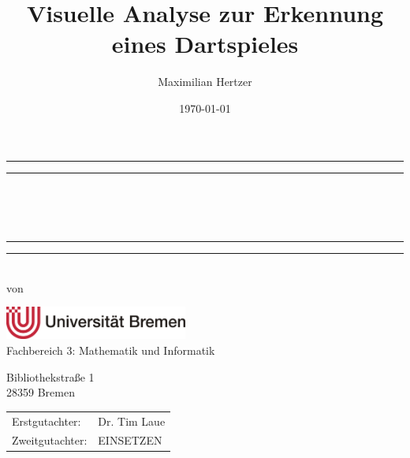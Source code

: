 \documentclass[
  ,a4paper
  ,ngerman
  ,twoside
  ,openright
  ,11pt
  ,bibliography=totoc
  ,index=totoc
  ,listof=totoc
  ,titlepage=true
  ,headlines=2
  ,footlines=2
  ,svgnames
  ,BCOR=5mm
  ,numbers=noendperiod
  ]{scrreprt}
\author{Maximilian Hertzer}
\title{Visuelle Analyse zur Erkennung eines Dartspieles}
\subtitle{}
\date{\today}
\begin{document}
\lstset{language=Python}  
\thispagestyle{empty}


\makeatletter
\begin{titlepage}
	\centering
	\rule[0.5ex]{\linewidth}{2pt}\vspace*{-\baselineskip}\vspace*{3.2pt}
	\rule[0.5ex]{\linewidth}{1pt}\\[\baselineskip]
	{\Huge \@title }\\[4mm]
	{\Large \textit{\@subject}}\\
	\rule[0.5ex]{\linewidth}{1pt}\vspace*{-\baselineskip}\vspace{3.2pt}
	\rule[0.5ex]{\linewidth}{2pt}\\
	\vspace{6.5mm}
	{\large von}\\
	\vspace{6.5mm}
	{\LARGE \textsc{\@author}}
	
	\vspace{11mm}
	\includegraphics[width=6cm]{media/uni-bremen}\\
	\vspace{3mm}
	{\large Fachbereich 3: Mathematik und Informatik}
	
	Bibliothekstraße 1 \\
	28359 Bremen
	
	\vspace{9mm}
	{\large\textsc{\@date}}
	\vfill
    \begin{tabular}{ll}
        
        Erstgutachter:  & Dr. Tim Laue\\
        Zweitgutachter: & EINSETZEN\\
    \end{tabular}
	\vspace{12mm}
\end{titlepage}
\makeatother
\cleardoublepage
\listoftodos
\tableofcontents

\listoffigures
\begingroup
\let\cleardoublepage\relax
\listoftables
\endgroup








\printbibliography

\appendix

\end{document}
